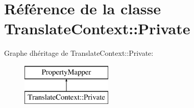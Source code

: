 \hypertarget{class_translate_context_1_1_private}{}\section{Référence de la classe Translate\+Context\+:\+:Private}
\label{class_translate_context_1_1_private}
Graphe d\textquotesingle{}héritage de Translate\+Context\+:\+:Private\+:\begin{figure}[H]
\begin{center}
\leavevmode
\includegraphics[height=2.000000cm]{class_translate_context_1_1_private}
\end{center}
\end{figure}
